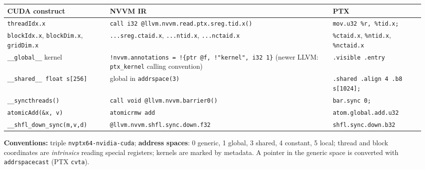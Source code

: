 \documentclass[10pt,a4paper,openany,oneside]{report}
\begin{document}
\begin{center}\small
\begin{xltabular}{\textwidth}{@{}L{4.3cm}L{5.3cm}Y@{}}
\toprule
\textbf{CUDA construct} & \textbf{NVVM IR} & \textbf{PTX}\\
\midrule\endhead
\texttt{threadIdx.x} & \texttt{call i32 @llvm.nvvm.read.ptx.sreg.tid.x()} & \texttt{mov.u32 \%r, \%tid.x;}\\
\texttt{blockIdx.x}, \texttt{blockDim.x}, \texttt{gridDim.x} & \texttt{...sreg.ctaid.x}, \texttt{...ntid.x}, \texttt{...nctaid.x} & \texttt{\%ctaid.x}, \texttt{\%ntid.x}, \texttt{\%nctaid.x}\\
\texttt{\_\_global\_\_} kernel & \texttt{!nvvm.annotations = !\{ptr @f, !"kernel", i32 1\}} (newer LLVM: \texttt{ptx\_kernel} calling convention) & \texttt{.visible .entry}\\
\texttt{\_\_shared\_\_ float s[256]} & global in \texttt{addrspace(3)} & \texttt{.shared .align 4 .b8 s[1024];}\\
\texttt{\_\_syncthreads()} & \texttt{call void @llvm.nvvm.barrier0()} & \texttt{bar.sync 0;}\\
\texttt{atomicAdd(\&x, v)} & \texttt{atomicrmw add} & \texttt{atom.global.add.u32}\\
\texttt{\_\_shfl\_down\_sync(m,v,d)} & \texttt{@llvm.nvvm.shfl.sync.down.f32} & \texttt{shfl.sync.down.b32}\\
\bottomrule
\end{xltabular}
\end{center}
\textbf{Conventions:} triple \texttt{nvptx64-nvidia-cuda}; \textbf{address spaces}: 0 generic, 1 global, 3 shared, 4 constant, 5 local; thread and block coordinates are \emph{intrinsics} reading special registers; kernels are marked by metadata. A pointer in the generic space is converted with \texttt{addrspacecast} (PTX \texttt{cvta}).
\end{document}

